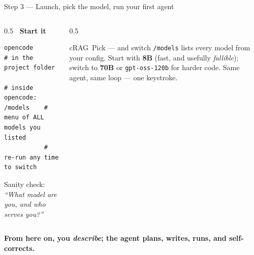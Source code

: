 \begin{frame}[fragile]{Step 3 --- Launch, pick the model, run your first agent}
  \begin{columns}[t, totalwidth=\textwidth]
    \begin{column}{0.5\textwidth}
      {\footnotesize\bfseries\color{accentblue}\faPlay\ Start it}
      \begin{lstlisting}[style=shell]
opencode          # in the project folder

# inside opencode:
/models    # menu of ALL models you listed
           # re-run any time to switch
      \end{lstlisting}
      {\scriptsize\color{midgray}Sanity check: \emph{``What model are you, and who serves you?''}}
    \end{column}
    \begin{column}{0.5\textwidth}
      \begin{featbox}{cRAG}{\faRandom\ Pick --- and switch}
        \scriptsize \texttt{/models} lists every model from your config. Start with
        \textbf{8B} (fast, and usefully \emph{fallible}); switch to \textbf{70B} or
        \texttt{gpt-oss-120b} for harder code. Same agent, same loop --- one keystroke.
      \end{featbox}
    \end{column}
  \end{columns}
  \vspace{6pt}
  \begin{center}\small\color{labnavy}\bfseries
    From here on, you \emph{describe}; the agent plans, writes, runs, and self-corrects.\end{center}
\end{frame}

